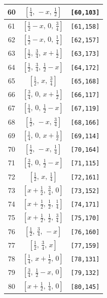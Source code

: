 \documentclass[fleqn,8pt]{jsarticle}
\begin{document}
\begin{longtable}{ccc}
60 & $\left[ \frac{1}{4},\, - x,\, \frac{1}{2} \right]$ & {\tt [60,103]} \\ \hline
61 & $\left[ \frac{1}{2} - x,\, 0,\, \frac{3}{4} \right]$ & {\tt [61,158]} \\ \hline
62 & $\left[ \frac{1}{2} - x,\, 0,\, \frac{1}{4} \right]$ & {\tt [62,157]} \\ \hline
63 & $\left[ \frac{1}{2},\, \frac{3}{4},\, x + \frac{1}{2} \right]$ & {\tt [63,173]} \\ \hline
64 & $\left[ \frac{1}{2},\, \frac{3}{4},\, \frac{1}{2} - x \right]$ & {\tt [64,172]} \\ \hline
65 & $\left[ \frac{1}{2},\, x,\, \frac{3}{4} \right]$ & {\tt [65,168]} \\ \hline
66 & $\left[ \frac{3}{4},\, 0,\, x + \frac{1}{2} \right]$ & {\tt [66,117]} \\ \hline
67 & $\left[ \frac{1}{4},\, 0,\, \frac{1}{2} - x \right]$ & {\tt [67,119]} \\ \hline
68 & $\left[ \frac{1}{2},\, - x,\, \frac{3}{4} \right]$ & {\tt [68,166]} \\ \hline
69 & $\left[ \frac{1}{4},\, 0,\, x + \frac{1}{2} \right]$ & {\tt [69,114]} \\ \hline
70 & $\left[ \frac{1}{2},\, - x,\, \frac{1}{4} \right]$ & {\tt [70,164]} \\ \hline
71 & $\left[ \frac{3}{4},\, 0,\, \frac{1}{2} - x \right]$ & {\tt [71,115]} \\ \hline
72 & $\left[ \frac{1}{2},\, x,\, \frac{1}{4} \right]$ & {\tt [72,161]} \\ \hline
73 & $\left[ x + \frac{1}{2},\, \frac{3}{4},\, 0 \right]$ & {\tt [73,152]} \\ \hline
74 & $\left[ x + \frac{1}{2},\, \frac{1}{2},\, \frac{1}{4} \right]$ & {\tt [74,171]} \\ \hline
75 & $\left[ x + \frac{1}{2},\, \frac{1}{2},\, \frac{3}{4} \right]$ & {\tt [75,170]} \\ \hline
76 & $\left[ \frac{1}{2},\, \frac{3}{4},\, - x \right]$ & {\tt [76,160]} \\ \hline
77 & $\left[ \frac{1}{2},\, \frac{3}{4},\, x \right]$ & {\tt [77,159]} \\ \hline
78 & $\left[ \frac{1}{4},\, x + \frac{1}{2},\, 0 \right]$ & {\tt [78,131]} \\ \hline
79 & $\left[ \frac{3}{4},\, \frac{1}{2} - x,\, 0 \right]$ & {\tt [79,132]} \\ \hline
80 & $\left[ x + \frac{1}{2},\, \frac{1}{4},\, 0 \right]$ & {\tt [80,145]} \\ \hline

\end{longtable}
\end{document}
